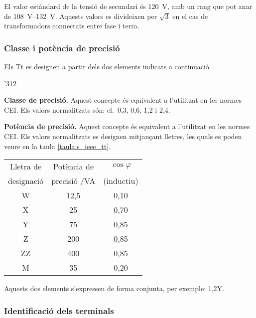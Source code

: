 El valor estàndard de la tensió de
secundari és \qty{120}{V}, amb un rang  que pot anar de \qtyrange{108}{132}{V}. Aquests valors es divideixen per $\sqrt{3}$ en el cas de transformadors connectats entre fase i terra.


\subsubsection{Classe i potència de precisió}

Els Tt es designen a partir dels dos
elements indicats a continuació.

\begin{dingautolist}{'312}
    \item \textbf{Classe de precisió.} Aquest concepte és equivalent
    a l'utilitzat en les normes CEI. Els valors
    normalitzats són: cl.~0,3, 0,6, 1,2 i 2,4.

    \item \textbf{Potència de precisió.} Aquest concepte és equivalent
    a l'utilitzat en les normes CEI. Els valors
    normalitzats es designen mitjançant lletres, les quals es poden veure en
    la taula \vref{taula:s_ieee_tt}.

    \begin{center}
        \label{taula:s_ieee_tt}
        \begin{tabular}{ccc}
        \toprule[1pt]
        Lletra de & Potència de & $\cos\varphi$\\
        designació &  precisió /VA &  (inductiu)\\
        \midrule
        W & 12,5 & 0,10\\
        X & 25 & 0,70 \\
        Y & 75 & 0,85 \\
        Z & 200 & 0,85 \\
        ZZ & 400 & 0,85 \\
        M & 35 & 0,20 \\
        \bottomrule[1pt]
        \end{tabular}
    \end{center}
\end{dingautolist}

Aquests dos elements s'expressen de forma conjunta, per exemple:
1,2Y.

\subsubsection{Identificació dels terminals}

